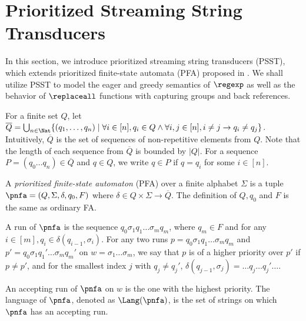 
\section{Prioritized Streaming String Transducers}  \label{sect:psst}

In this section, we introduce prioritized streaming string transducers (PSST), which extends prioritized finite-state automata (PFA) proposed in \cite{BM17}. We shall utilize PSST to model  the eager and greedy semantics of $\regexp$ as well as the behavior of $\replaceall$ functions with capturing groups and back references.

%
For a finite set $Q$, let $\overline{Q} = \bigcup_{n\in \Nat}\{ (q_1, \ldots, q_n) \mid \forall i \in [n], q_i \in Q \wedge \forall i,j \in[n], i \neq j \rightarrow q_i \neq q_j \}$. Intuitively, $\overline{Q}$ is the set of sequences of non-repetitive elements from $Q$. Note that the length of each sequence from $\overline{Q}$ is bounded by  $| Q |$. For a sequence $P = (q_0 \ldots q_n) \in \overline{Q}$ and  $q \in Q$, we write $q \in P$ if  $q = q_i$ for some $i \in [n]$. 


\begin{definition}
  A \emph{prioritized finite-state automaton} (PFA) over a finite alphabet $\Sigma$ is a tuple $\pnfa=(Q, \Sigma, \delta, q_0, F)$ where $\delta \in Q
  \times \Sigma \rightarrow \overline{Q}$. The definition of $Q, q_0$ and $F$ is the same as ordinary FA.
  
A run of $\pnfa$ is the sequence $q_0 \sigma_1 q_1 \ldots \sigma_m q_m$, where $q_m \in F$ and for any $i \in [m], q_i \in \delta (q_{i - 1}, \sigma_i)$. For any two runs $p = q_0 \sigma_1 q_1 \ldots \sigma_m q_m$ and $p' =  q_0 \sigma_1 q_1' \ldots \sigma_m q_m'$ on $w = \sigma_1 \ldots \sigma_m$, we say that $p$ is of a higher priority over  $p'$ if $p \neq p'$, and for the smallest index $j$ with $q_j \neq q_j'$, $\delta (q_{j - 1}, \sigma_j) = \ldots q_j \ldots q_j' \ldots$.
  
An accepting run of $\pnfa$ on $w$ is the one with the highest priority. The language of $\pnfa$, denoted as $\Lang(\pnfa)$, is the set of
 strings on which $\pnfa$ has an accepting run.
\end{definition}

